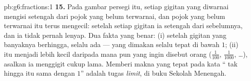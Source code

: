 \begin{solution}{pb:g6:fractions:1}
\textbf{15.} Pada gambar persegi itu, setiap gigitan yang diwarnai
mengisi setengah dari pojok yang belum terwarnai, dan pojok yang belum
terwarnai itu terus mengecil: setelah setiap gigitan ia setengah dari
sebelumnya, dan ia tidak pernah lenyap. Dua fakta yang benar: (i)
setelah gigitan yang banyaknya berhingga, selalu ada  --- 
yang dimakan selalu tepat di bawah $1$; (ii)  itu menjadi lebih
kecil daripada  mana pun yang ingin disebut orang
($\frac{1}{100}$, $\frac{1}{1000}$, \dots), asalkan ia menggigit cukup
lama. Memberi makna yang tepat pada kata `` tak hingga itu sama
dengan $1$'' adalah tugas \emph{limit}, di buku Sekolah Menengah.

\end{solution}
